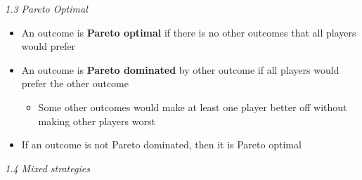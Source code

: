 \documentclass[12pt]{article}
\begin{document}
\noindent
\textsl{1.3 Pareto Optimal}
\begin{itemize}
\item An outcome is \textbf{Pareto optimal} if there is no other outcomes that all players would prefer
\item An outcome is \textbf{Pareto dominated} by other outcome if all players would prefer the other outcome
\begin{itemize}
\item Some other outcomes would make at least one player better off without making other players worst
\end{itemize}
\item If an outcome is not Pareto dominated, then it is Pareto optimal
\end{itemize}

\noindent
\textsl{1.4 Mixed strategies}
\end{document}
